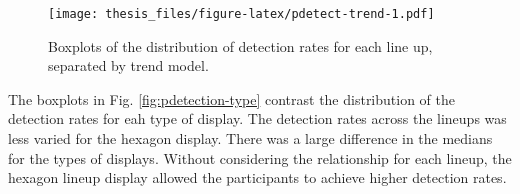 \documentclass{monashthesis}
\begin{document}
\begin{Shaded}
\end{Shaded}

\begin{figure}
\centering
\texttt{[image: thesis\_files/figure-latex/pdetect-trend-1.pdf]}
\caption{\label{fig:pdetect-trend}Boxplots of the distribution of detection rates for each line up, separated by trend model.}
\end{figure}

The boxplots in Fig. \ref{fig:pdetection-type} contrast the distribution of the detection rates for eah type of display.
The detection rates across the lineups was less varied for the hexagon display. There was a large difference in the medians for the types of displays.
Without considering the relationship for each lineup, the hexagon lineup display allowed the participants to achieve higher detection rates.

\begin{Shaded}
\end{Shaded}
\end{document}
